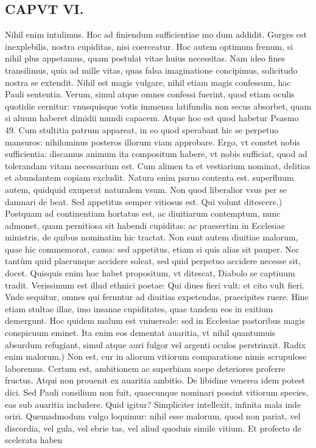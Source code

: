 \documentclass{article}
\begin{document}
\begin{pages}
\section*{CAPVT VI. }
\marginpar{[ p.77 ]}\pstart Nihil enim intulimus. Hoc ad finiendum sufficientiae mo dum addidit. Gurges est inexplebilis, nostra cupiditas, nisi coerceatur. Hoc autem optimum frenum, si nihil plus appetamus, quam postulat vitae huius necessitas. Nam ideo fines transilimus, quia ad mille vitas, quas falsa imaginatione concipimus, solicitudo nostra se extendit. Nihil est magis vulgare, nihil etiam magis confessum, hac Pauli sententia. Verum, simul atque omnes confessi fuerint, quod etiam oculis quotidie cernitur: vnusquisque votis immensa latifundia non secus absorbet, quam si aluum haberet dimidii mundi capacem. Atque hoc est quod habetur Psasmo 49. Cum stultitia patrum appareat, in eo quod sperabant hic se perpetuo mansuros: nihilominus posteros illorum viam approbare. Ergo, vt constet nobis sufficientia: discamus animum ita compositum habere, vt nobis sufficiat, quod ad tolerandam vitam necessarium est. Cum alimen ta et vestiarium nominat, delitias et abundantem copiam excludit. Natura enim paruo contenta est. superfluum autem, quidquid exuperat naturalem vsum. Non quod liberalior vsus per se damnari de beat. Sed appetitus semper vitiosus est.  \pend\pstart Qui volunt ditescere.) Postquam ad continentiam hortatus est, ac diuitiarum contemptum, nunc admonet, quam pernitiosa sit habendi cupiditas: ac praesertim in Ecclesiae ministris, de quibus nominatim hic tractat. Non sunt autem diuitiae malorum, quae hic commemorat, causa: sed appetitus, etiam si quis alias sit pauper. Nec tantùm quid plaerunque accidere soleat, sed quid perpetuo accidere necesse sit, docet. Quisquis enim hoc habet propositum, vt ditescat, Diabolo se captiuum tradit. Verissimum est illud ethnici poetae: Qui diues fieri vult: et cito vult fieri. Vnde sequitur, omnes qui feruntur ad diuitias expetendas, praecipites ruere. Hine etiam stultae illae, imo insanae cupiditates, quae tandem eos in exitium demergunt. Hoc quidem malum est vniuersale: sed in Ecclesiae pastoribus magis conspicuum eminet. Ita enim eos dementat auaritia, vt nihil quantumuis absurdum refugiant, simul atque auri fulgor vel argenti oculos perstrinxit.  \pend\pstart Radix enim malorum.) Non est, cur in aliorum vitiorum comparatione nimis scrupulose laboremus. Certum est, ambitionem ac superbiam saepe deteriores proferre fructus. Atqui non prouenit ex auaritia ambitio. De libidine venerea idem potest dici. Sed Pauli consilium non fuit, quaecunque nominari possint vitiorum species, eas sub auaritia includere. Quid igitur? Simpliciter intellexit, infinita mala inde oriri. Quemadmodum vulgo loquimur: nihil esse malorum, quod non pariat, vel discordia, vel gula, vel ebrie tas, vel aliud quoduis simile vitium. Et profecto de scelerata haben  \pend

\end{pages}
\end{document}
